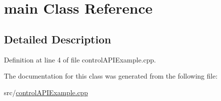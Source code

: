 \hypertarget{classmain}{}\section{main Class Reference}
\label{classmain}


\subsection{Detailed Description}


Definition at line 4 of file control\+A\+P\+I\+Example.\+cpp.



The documentation for this class was generated from the following file\+:\begin{DoxyCompactItemize}
\item 
src/\mbox{\hyperlink{controlAPIExample_8cpp}{control\+A\+P\+I\+Example.\+cpp}}\end{DoxyCompactItemize}
